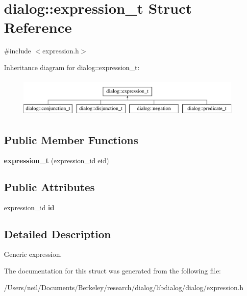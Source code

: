 \hypertarget{structdialog_1_1expression__t}{}\section{dialog\+:\+:expression\+\_\+t Struct Reference}
\label{structdialog_1_1expression__t}


{\ttfamily \#include $<$expression.\+h$>$}

Inheritance diagram for dialog\+:\+:expression\+\_\+t\+:\begin{figure}[H]
\begin{center}
\leavevmode
\includegraphics[height=2.000000cm]{structdialog_1_1expression__t}
\end{center}
\end{figure}
\subsection*{Public Member Functions}
\begin{DoxyCompactItemize}
\item 
\mbox{\label{structdialog_1_1expression__t_a160723f49579e321986ab217777a8238}} 
{\bfseries expression\+\_\+t} (expression\+\_\+id eid)
\end{DoxyCompactItemize}
\subsection*{Public Attributes}
\begin{DoxyCompactItemize}
\item 
\mbox{\label{structdialog_1_1expression__t_a73271728ad2081b7bdaf00f7051eef66}} 
expression\+\_\+id {\bfseries id}
\end{DoxyCompactItemize}


\subsection{Detailed Description}
Generic expression. 

The documentation for this struct was generated from the following file\+:\begin{DoxyCompactItemize}
\item 
/\+Users/neil/\+Documents/\+Berkeley/research/dialog/libdialog/dialog/expression.\+h\end{DoxyCompactItemize}

